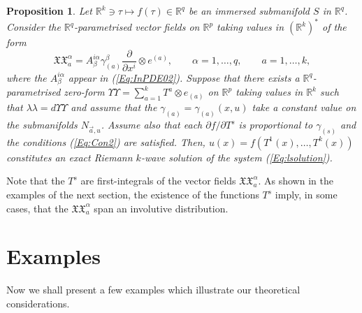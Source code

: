 \documentclass{birkjour}
\newtheorem{prop}[thm]{Proposition}
\theoremstyle{definition}
\theoremstyle{remark}
\numberwithin{equation}{section}
\numberwithin{equation}{section}
\numberwithin{thm}{section}
\numberwithin{equation}{section}
\numberwithin{thm}{section}
\begin{document}
\begin{prop}
	Let $\mathbb{R}^k\ni\tau\mapsto f(\tau)\in \mathbb{R}^q$ be an immersed submanifold $S$ in $\mathbb{R}^q$. Consider the  $\mathbb{R}^q$-parametrised vector fields on $\mathbb{R}^p$ taking values in $(\mathbb{R}^k)^*$ of the form 
	$$
	\mathfrak{X}\!\!\!\!\mathfrak{X}_a^\alpha = A_{\beta}^{i\alpha}\gamma_{(a)}^\beta\frac{\partial}{\partial x^i}\otimes e^{(a)},\qquad \alpha=1,\ldots,q,\qquad a=1,\ldots,k,
	$$
	where the $A^{i\alpha}_\beta$ appear in (\ref{Eq:InPDE02}). Suppose that there exists a $\mathbb{R}^q$-parametrised zero-form $\Upsilon\!\!\!\!\!\Upsilon=\sum_{a=1}^kT^a\otimes e_{(a)}$ on $\mathbb{R}^p$ taking values in  $\mathbb{R}^k$ such that $\lambda\!\!\!\!\lambda =d\Upsilon\!\!\!\!\!\Upsilon$ and assume that the $\gamma_{(a)}=\gamma_{(a)}(x,u)$ take a constant value on the submanifolds $N_{\vec{a},u}$. Assume also that each $\partial f/\partial T^s$ is proportional to $\gamma_{(s)}$ and the conditions (\ref{Eq:Con2}) are satisfied. Then,  $u(x)=f(T^1(x),\ldots,T^k(x))$ constitutes an exact Riemann $k$-wave solution of the system (\ref{Eq:lsolution}). 
\end{prop}	

Note that the $T^s$ are first-integrals of the vector fields $\mathfrak{X}\!\!\!\!\mathfrak{X}^\alpha _a$. As shown in   the examples of the next section, the existence of the functions $T^s$ imply, in some cases, that the $\mathfrak{X}\!\!\!\!\mathfrak{X}^\alpha _a$ span an involutive distribution.

\section{Examples}\label{Se:Appl}

Now we shall present a few examples which illustrate our theoretical considerations. 
\end{document}
